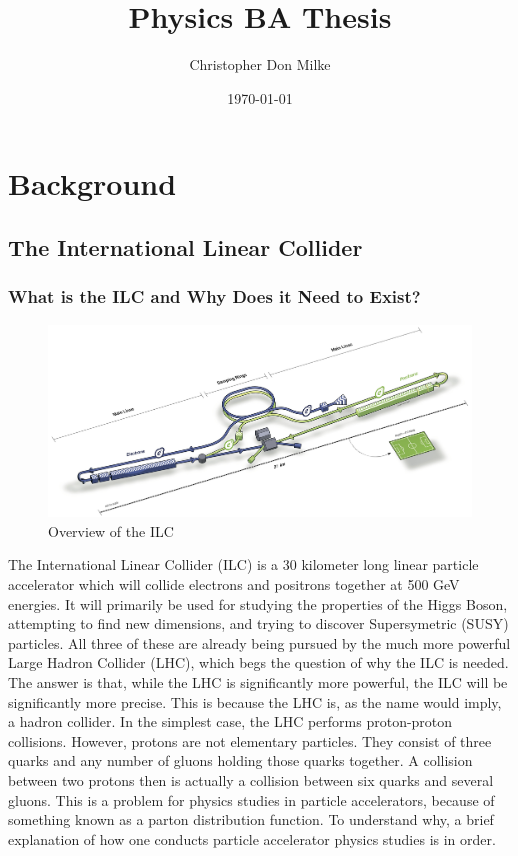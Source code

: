 \documentclass{report}
\title{Physics BA Thesis}
\author{Christopher Don Milke}
\date{\today}
\begin{document}
	\begin{titlepage}
        \maketitle
	\end{titlepage}

    \chapter{ Background }
        \section{ The International Linear Collider }
            \subsection{ What is the ILC and Why Does it Need to Exist? }
                \begin{figure}[h] 
                    \includegraphics[width=\textwidth]{ilcoverview}
                    \centering
                    \caption{Overview of the ILC}
                    \label{ilcoverview}
                \end{figure}

                The International Linear Collider (ILC) is a 30 kilometer long \cite{parton} linear particle accelerator \cite{specs} which will collide electrons and positrons together at 500 GeV energies. It will primarily be used for studying the properties of the Higgs Boson, attempting to find new dimensions, and trying to discover Supersymetric (SUSY) particles. All three of these are already being pursued by the much more powerful Large Hadron Collider (LHC), which begs the question of why the ILC is needed. The answer is that, while the LHC is significantly more powerful, the ILC will be significantly more precise. This is because the LHC is, as the name would imply, a hadron collider. In the simplest case, the LHC performs proton-proton collisions. However, protons are not elementary particles. They consist of three quarks and any number of gluons holding those quarks together. A collision between two protons then is actually a collision between six quarks and several gluons. This is a problem for physics studies in particle accelerators, because of something known as a parton distribution function. To understand why, a brief explanation of how one conducts particle accelerator physics studies is in order.
\end{document}
